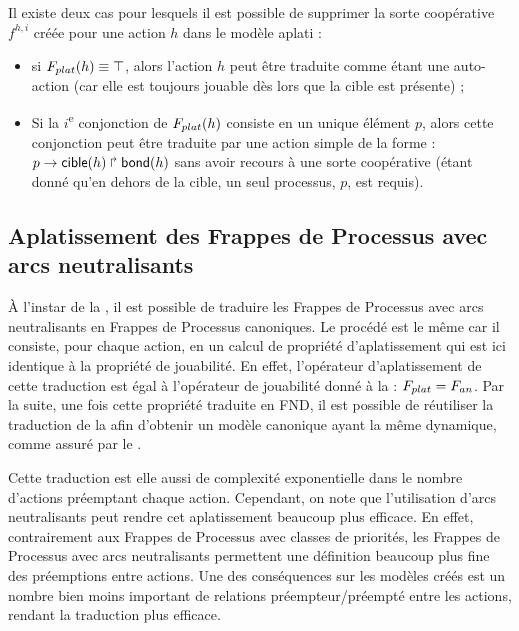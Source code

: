 Il existe deux cas pour lesquels il est possible de supprimer la sorte coopérative $f^{h,i}$
créée pour une action $h$ dans le modèle aplati :
\begin{itemize}
  \item si $F_{plat}(h) \equiv \top$, alors l'action $h$ peut être traduite comme étant
    une auto-action (car elle est toujours jouable dès lors que la cible est présente) ;
  \item Si la $i$\textsuperscript{e} conjonction de $F_{plat}(h)$ consiste
    en un unique élément $p$, alors cette conjonction peut être traduite par une action simple
    de la forme : $p\rightarrow\mathsf{cible}(h)\Rsh\mathsf{bond}(h)$ sans avoir recours à une sorte coopérative
    (étant donné qu'en dehors de la cible, un seul processus, $p$, est requis).
\end{itemize}



\subsection{Aplatissement des Frappes de Processus avec arcs neutralisants}

À l'instar de la , il est possible de traduire les Frappes de Processus
avec arcs neutralisants en Frappes de Processus canoniques.
Le procédé est le même car il consiste, pour chaque action,
en un calcul de propriété d'aplatissement
qui est ici identique à la propriété de jouabilité.
En effet, l'opérateur d'aplatissement de cette traduction est égal à l'opérateur de jouabilité 
donné à la  : $F_{plat} = F_{an}$.
Par la suite, une fois cette propriété traduite en FND, il est possible de réutiliser
la traduction de la  afin d'obtenir un modèle canonique
ayant la même dynamique, comme assuré par le .

Cette traduction est elle aussi de complexité exponentielle dans le nombre d'actions
préemptant chaque action.
Cependant, on note que l'utilisation d'arcs neutralisants peut rendre cet aplatissement
beaucoup plus efficace.
En effet, contrairement aux Frappes de Processus avec classes de priorités,
les Frappes de Processus avec arcs neutralisants permettent une définition beaucoup plus fine
des préemptions entre actions.
Une des conséquences sur les modèles créés est un nombre bien moins important de relations
préempteur/préempté entre les actions, rendant la traduction plus efficace.




